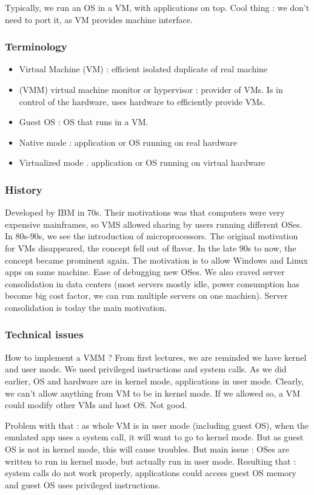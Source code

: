 \documentclass[12pt,a4paper]{article}
\begin{document}
Typically, we run an OS in a VM, with applications on top. Cool thing : we don't need to port it, as VM provides machine interface. 
\subsubsection{Terminology}
\begin{itemize}
	\item Virtual Machine (VM) : efficient isolated duplicate of real machine
	\item (VMM) virtual machine monitor or hypervisor : provider of VMs. Is in control of the hardware, uses hardware to efficiently provide VMs.
	\item Guest OS : OS that runs in a VM. 
	\item Native mode : application or OS running on real hardware
	\item Virtualized mode . application or OS running on virtual hardware
\end{itemize}
\subsubsection{History}
Developed by IBM in 70s. Their motivations was that computers were very expensive mainframes, so VMS allowed sharing by users running different OSes. In 80s-90s, we see the introduction of microprocessors. The original motivation for VMs disappeared, the concept fell out of flavor. In the late 90s to now, the concept became prominent again. The motivation is to allow Windows and Linux apps on same machine. Ease of debugging new OSes. We also craved server consolidation in data centers (most servers mostly idle, power consumption has become big cost factor, we can run multiple servers on one machien). Server consolidation is today the main motivation. 
\subsubsection{Technical issues}
How to implement a VMM ? From first lectures, we are reminded we have kernel and user mode. We used privileged instructions and system calls. As we did earlier, OS and hardware are in kernel mode, applications in user mode. Clearly, we can't allow anything from VM to be in kernel mode. If we allowed so, a VM could modify other VMs and host OS. Not good. 

Problem with that : as whole VM is in user mode (including guest OS), when the emulated app uses a system call, it will want to go to kernel mode. But as guest OS is not in kernel mode, this will cause troubles. But main issue : OSes are written to run in kernel mode, but actually run in user mode. Resulting that : system calls do not work properly, applications could access guest OS memory and guest OS uses privileged instructions. 
\end{document}
